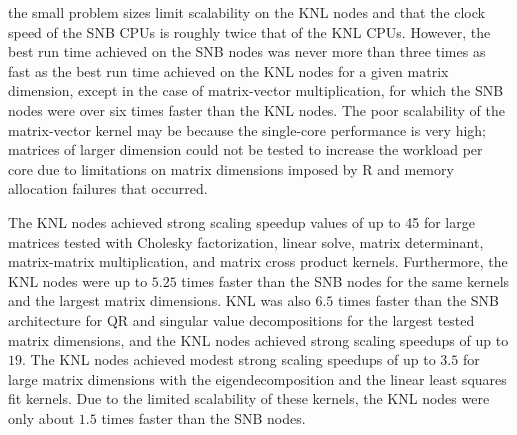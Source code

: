 the small problem sizes limit scalability on the KNL nodes and that the clock speed of the
SNB CPUs is roughly twice that of the KNL CPUs. However, the best run time achieved on the
SNB nodes was never more than three times as fast as the best run time achieved on the KNL
nodes for a given matrix dimension, except in the case of matrix-vector multiplication,
for which the SNB nodes were over six times faster than the KNL nodes. The poor
scalability of the matrix-vector kernel may be because the single-core performance is very
high; matrices of larger dimension could not be tested to increase the workload per
core due to limitations on matrix dimensions imposed by R and memory allocation failures
that occurred.

The KNL nodes achieved strong scaling speedup values of up to 45 for large matrices
tested with Cholesky factorization, linear solve, matrix determinant, matrix-matrix
multiplication, and matrix cross product kernels.
Furthermore, the KNL nodes were up to $5.25$ times faster than the SNB nodes for the same
kernels and the largest matrix dimensions. KNL was also $6.5$ times faster than the SNB
architecture for QR and singular value decompositions for the largest tested matrix
dimensions, and the KNL nodes achieved strong scaling speedups of up to $19$. The KNL
nodes achieved modest strong scaling speedups of up to $3.5$ for large matrix dimensions
with the eigendecomposition and the linear least squares fit kernels.
Due to the limited scalability of these kernels, the KNL nodes were only about $1.5$ times
faster than the SNB nodes.

